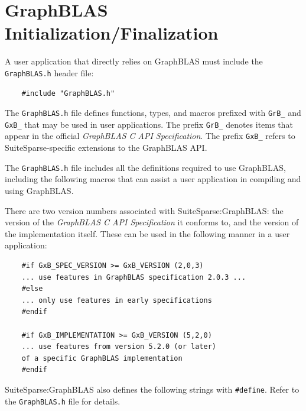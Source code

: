 
\newpage
\section{GraphBLAS Initialization/Finalization} %
\label{init_and_fini}

A user application that directly relies on GraphBLAS must include the
\verb'GraphBLAS.h' header file:

\begin{mdframed}[userdefinedwidth=6in]
{\footnotesize
\begin{verbatim}
    #include "GraphBLAS.h"
\end{verbatim}
} \end{mdframed}

The \verb'GraphBLAS.h' file defines functions, types, and macros prefixed with
\verb'GrB_' and \verb'GxB_' that may be used in user applications.  The prefix
\verb'GrB_' denotes items that appear in the official {\em GraphBLAS C API
Specification}.  The prefix \verb'GxB_' refers to SuiteSparse-specific
extensions to the GraphBLAS API.

The \verb'GraphBLAS.h' file includes all the definitions required to use
GraphBLAS, including the following macros that can assist a user application in
compiling and using GraphBLAS.

There are two version numbers associated with SuiteSparse:GraphBLAS:
the version of the {\em GraphBLAS C API Specification} it
conforms to, and the version of the implementation itself.  These can
be used in the following manner in a user application:

{\footnotesize
\begin{verbatim}
    #if GxB_SPEC_VERSION >= GxB_VERSION (2,0,3)
    ... use features in GraphBLAS specification 2.0.3 ...
    #else
    ... only use features in early specifications
    #endif

    #if GxB_IMPLEMENTATION >= GxB_VERSION (5,2,0)
    ... use features from version 5.2.0 (or later)
    of a specific GraphBLAS implementation
    #endif \end{verbatim}}

SuiteSparse:GraphBLAS also defines the following strings with \verb'#define'.
Refer to the \verb'GraphBLAS.h' file for details.

